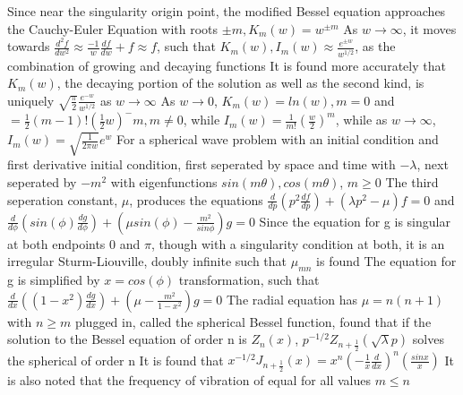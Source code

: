 \documentclass[11 pt, twoside]{article}
\newenvironment{outline*}
{
	\begin{outline}[enumerate]
	}
	{\end{outline}
}
\begin{document}
\begin{outline*}
			\4 Since near the singularity origin point, the modified Bessel equation approaches the Cauchy-Euler Equation with roots $\pm m, K_m(w) = w^{\pm m}$
			\4 As $w \to \infty$, it moves towards $\frac{d^2f}{dw^2} \approx \frac{-1}{w}\frac{df}{dw} + f \approx f$, such that $K_m(w), I_m(w) \approx \frac{e^{\pm w}}{w^{1/2}}$, as the combination of growing and decaying functions
			\4 It is found more accurately that $K_m(w)$, the decaying portion of the solution as well as the second kind, is uniquely $\sqrt{\frac{\pi}{2}}\frac{e^{-w}}{w^{1/2}}$ as $w \to \infty$
			\4 As $w \to 0$, $K_m(w) = ln(w), m = 0$ and $= \frac{1}{2}(m - 1)!(\frac{1}{2}w)^-m, m \neq 0$, while $I_m(w) = \frac{1}{m!}(\frac{w}{2})^m$, while as $w \to \infty$, $I_m(w) = \sqrt{\frac{1}{{2\pi w}}}e^w$
\1 For a spherical wave problem with an initial condition and first derivative initial condition, first seperated by space and time with $-\lambda$, next seperated by $-m^2$ with eigenfunctions $sin(m\theta), cos(m\theta)$, $m \geq 0$
	\2 The third seperation constant, $\mu$, produces the equations $\frac{d}{dp}(p^2\frac{df}{dp}) + (\lambda p^2 - \mu)f = 0$ and $\frac{d}{d\phi}(sin(\phi)\frac{dg}{d\phi}) + (\mu sin(\phi) - \frac{m^2}{sin\phi})g = 0$
	\2 Since the equation for g is singular at both endpoints 0 and $\pi$, though with a singularity condition at both, it is an irregular Sturm-Liouville, doubly infinite such that $\mu_{mn}$ is found
		\3 The equation for g is simplified by $x = cos(\phi)$ transformation, such that $\frac{d}{dx}((1 - x^2)\frac{dg}{dx}) + (\mu - \frac{m^2}{1 - x^2})g = 0$
		\3
	\2 The radial equation has $\mu = n(n + 1)$ with $n \geq m$ plugged in, called the spherical Bessel function, found that if the solution to the Bessel equation of order n is $Z_n(x)$, $p^{-1/2}Z_{n + \frac{1}{2}}(\sqrt{\lambda}p)$ solves the spherical of order n
		\3 It is found that $x^{-1/2}J_{n + \frac{1}{2}}(x) = x^n(-\frac{1}{x}\frac{d}{dx})^n(\frac{sinx}{x})$
		\3 It is also noted that the frequency of vibration of equal for all values $m \leq n$
\end{outline*}
\end{document}
